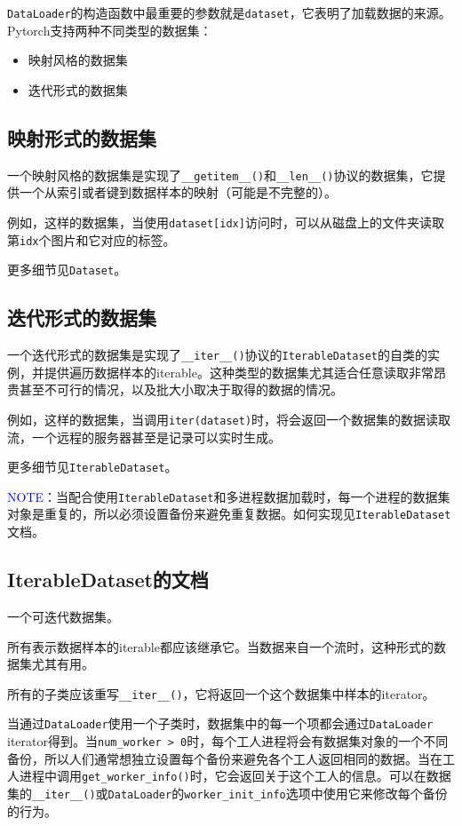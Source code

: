 \documentclass[../main.tex]{subfile}
\begin{document}
\lstinline{DataLoader}的构造函数中最重要的参数就是\lstinline{dataset}，它表明了加载数据的来源。Pytorch支持两种不同类型的数据集：
\begin{itemize}
    \item 映射风格的数据集
    \item 迭代形式的数据集
\end{itemize}

\subsection{映射形式的数据集}

一个映射风格的数据集是实现了\lstinline{__getitem__()}和\lstinline{__len__()}协议的数据集，它提供一个从索引或者键到数据样本的映射（可能是不完整的）。

例如，这样的数据集，当使用\lstinline{dataset[idx]}访问时，可以从磁盘上的文件夹读取第\lstinline{idx}个图片和它对应的标签。

更多细节见\lstinline{Dataset}。

\subsection{迭代形式的数据集}

一个迭代形式的数据集是实现了\lstinline{__iter__()}协议的\lstinline{IterableDataset}的自类的实例，并提供遍历数据样本的iterable。这种类型的数据集尤其适合任意读取非常昂贵甚至不可行的情况，以及批大小取决于取得的数据的情况。

例如，这样的数据集，当调用\lstinline{iter(dataset)}时，将会返回一个数据集的数据读取流，一个远程的服务器甚至是记录可以实时生成。

更多细节见\lstinline{IterableDataset}。

\textcolor{blue}{NOTE}：当配合使用\lstinline{IterableDataset}和多进程数据加载时，每一个进程的数据集对象是重复的，所以必须设置备份来避免重复数据。如何实现见\lstinline{IterableDataset}文档。

\subsection{IterableDataset的文档}

一个可迭代数据集。

所有表示数据样本的iterable都应该继承它。当数据来自一个流时，这种形式的数据集尤其有用。

所有的子类应该重写\lstinline{__iter__()}，它将返回一个这个数据集中样本的iterator。

当通过\lstinline{DataLoader}使用一个子类时，数据集中的每一个项都会通过\lstinline{DataLoader} iterator得到。当\lstinline{num_worker > 0}时，每个工人进程将会有数据集对象的一个不同备份，所以人们通常想独立设置每个备份来避免各个工人返回相同的数据。当在工人进程中调用\lstinline{get_worker_info()}时，它会返回关于这个工人的信息。可以在数据集的\lstinline{__iter__()}或\lstinline{DataLoader}的\lstinline{worker_init_info}选项中使用它来修改每个备份的行为。
\end{document}
